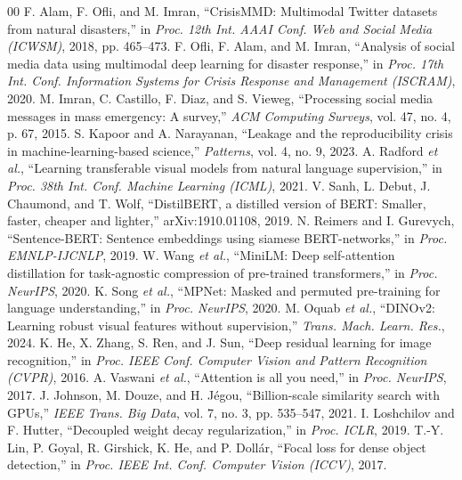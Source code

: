 \documentclass[conference]{IEEEtran}
\begin{document}
\begin{thebibliography}{00}
 F. Alam, F. Ofli, and M. Imran, ``CrisisMMD: Multimodal Twitter datasets from natural disasters,'' in \textit{Proc. 12th Int. AAAI Conf. Web and Social Media (ICWSM)}, 2018, pp. 465--473.
 F. Ofli, F. Alam, and M. Imran, ``Analysis of social media data using multimodal deep learning for disaster response,'' in \textit{Proc. 17th Int. Conf. Information Systems for Crisis Response and Management (ISCRAM)}, 2020.
 M. Imran, C. Castillo, F. Diaz, and S. Vieweg, ``Processing social media messages in mass emergency: A survey,'' \textit{ACM Computing Surveys}, vol. 47, no. 4, p. 67, 2015.
 S. Kapoor and A. Narayanan, ``Leakage and the reproducibility crisis in machine-learning-based science,'' \textit{Patterns}, vol. 4, no. 9, 2023.
 A. Radford \textit{et al.}, ``Learning transferable visual models from natural language supervision,'' in \textit{Proc. 38th Int. Conf. Machine Learning (ICML)}, 2021.
 V. Sanh, L. Debut, J. Chaumond, and T. Wolf, ``DistilBERT, a distilled version of BERT: Smaller, faster, cheaper and lighter,'' arXiv:1910.01108, 2019.
 N. Reimers and I. Gurevych, ``Sentence-BERT: Sentence embeddings using siamese BERT-networks,'' in \textit{Proc. EMNLP-IJCNLP}, 2019.
 W. Wang \textit{et al.}, ``MiniLM: Deep self-attention distillation for task-agnostic compression of pre-trained transformers,'' in \textit{Proc. NeurIPS}, 2020.
 K. Song \textit{et al.}, ``MPNet: Masked and permuted pre-training for language understanding,'' in \textit{Proc. NeurIPS}, 2020.
 M. Oquab \textit{et al.}, ``DINOv2: Learning robust visual features without supervision,'' \textit{Trans. Mach. Learn. Res.}, 2024.
 K. He, X. Zhang, S. Ren, and J. Sun, ``Deep residual learning for image recognition,'' in \textit{Proc. IEEE Conf. Computer Vision and Pattern Recognition (CVPR)}, 2016.
 A. Vaswani \textit{et al.}, ``Attention is all you need,'' in \textit{Proc. NeurIPS}, 2017.
 J. Johnson, M. Douze, and H. J\'egou, ``Billion-scale similarity search with GPUs,'' \textit{IEEE Trans. Big Data}, vol. 7, no. 3, pp. 535--547, 2021.
 I. Loshchilov and F. Hutter, ``Decoupled weight decay regularization,'' in \textit{Proc. ICLR}, 2019.
 T.-Y. Lin, P. Goyal, R. Girshick, K. He, and P. Doll\'ar, ``Focal loss for dense object detection,'' in \textit{Proc. IEEE Int. Conf. Computer Vision (ICCV)}, 2017.

\end{thebibliography}
\end{document}
